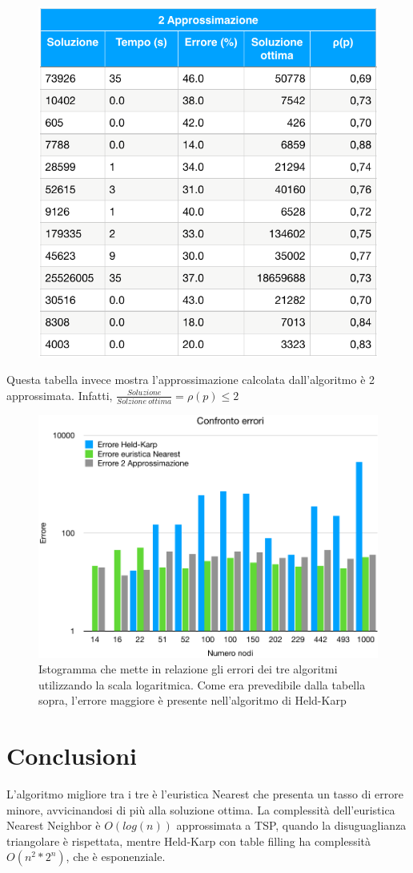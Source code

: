 \documentclass[a4paper]{article}
\begin{document}
\begin{figure}[H]
	\centering
	\includegraphics[width=0.7\linewidth]{2approx}
	\label{fig:2approx}
\end{figure}
Questa tabella invece mostra l'approssimazione calcolata dall'algoritmo è 2 approssimata. Infatti,
$\frac{Soluzione}{Solzione\ ottima} = \rho(p) \leq 2$
\begin{figure}[H]
	\begin{center}
	\includegraphics[width=17cm]{errore}
	\caption{Istogramma che mette in relazione gli errori dei tre algoritmi utilizzando la scala logaritmica. Come era prevedibile dalla tabella sopra, l'errore maggiore è presente nell'algoritmo di Held-Karp}	\label{fig:errore}
\end{center}
\end{figure}

\section{Conclusioni}
L'algoritmo migliore tra i tre è l'euristica Nearest che presenta un tasso di errore minore, avvicinandosi di più alla soluzione ottima. La complessità dell'euristica Nearest Neighbor è $O(log(n))$ approssimata a TSP, quando la disuguaglianza triangolare è rispettata, mentre Held-Karp con table filling ha complessità $O(n^2*2^n)$, che è esponenziale.
\end{document}
